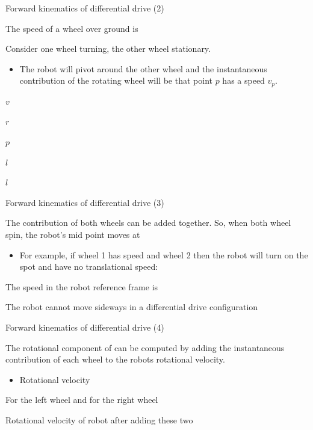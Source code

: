 \documentclass[compress]{beamer}
\begin{document}
\begin{frame}{Forward kinematics of differential drive (2)}

The speed of a wheel over ground is

Consider one wheel turning, the other wheel stationary.

\begin{itemize}
    \item The robot will pivot around the other wheel and the instantaneous
  contribution of the rotating wheel will be that point $p$ has a
  speed $v_p$.
\end{itemize}

$v$

$r$

$p$

$l$

$l$

\end{frame}

\begin{frame}{Forward kinematics of differential drive (3)}

The contribution of both wheels can be added together. So, when both
wheel spin, the robot's mid point moves at

\begin{itemize}
    \item For example, if wheel 1 has speed and wheel 2 then the robot will turn
  on the spot and have no translational speed:
\end{itemize}

The speed in the robot reference frame is

The robot cannot move sideways in a differential drive configuration

\end{frame}

\begin{frame}{Forward kinematics of differential drive (4)}

The rotational component of can be computed by adding the instantaneous
contribution of each wheel to the robots rotational velocity.

\begin{itemize}
    \item Rotational velocity
\end{itemize}

For the left wheel and for the right wheel

Rotational velocity of robot after adding these two

\end{frame}
\end{document}
